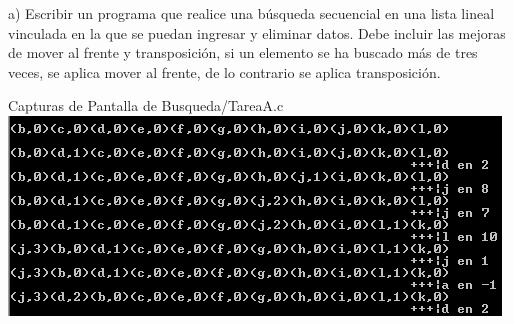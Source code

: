 a) Escribir un programa que realice una búsqueda
secuencial en una lista lineal vinculada en la
que se puedan ingresar y eliminar datos. Debe incluir
las mejoras de mover al frente y transposición, si un
elemento se ha buscado más de tres veces, se aplica
mover al frente, de lo contrario se aplica transposición.

Capturas de Pantalla de Busqueda/TareaA.c
\newline
\includegraphics{Busqueda/img/TareaA_1.png}
